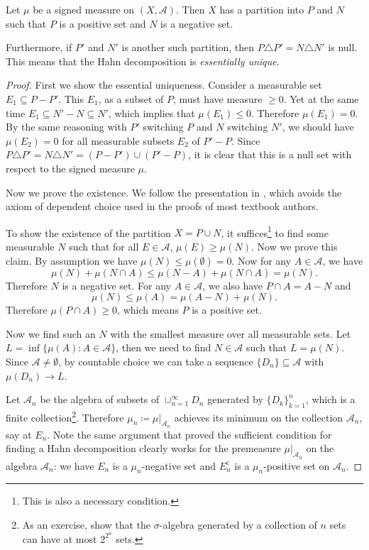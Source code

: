 \documentclass[10pt]{article}
\makeatletter
\numberwithin{equation}{section}
\theoremstyle{plain-star}
\theoremstyle{definition-star}
\theoremstyle{remark-star}
\newcommand\thmsname{Theorem}
\newcommand\nm@thmtype{theorem}
\theoremstyle{plain-star}
\newenvironment{namedthm}[1][Undefined Theorem Name]{
    \ifx{#1}{Undefined Theorem Name}
    \renewcommand\nm@thmtype{theorem}
    \else\renewcommand\thmsname{#1}
    \renewcommand\nm@thmtype{namedtheorem}
    \fi
    \begin{\nm@thmtype}\def\@currentlabelname{#1}}
    {\end{\nm@thmtype}}
\newcommand{\A}{\mathcal{A}}
\newcommand{\cpl}{\mathrm{c}}
\makeatother
\begin{document}
\begin{namedthm}[Hahn decomposition]
    Let $\mu$ be a signed measure on $(X,\A)$. Then $X$ has a partition into $P$ and $N$ such that $P$ is a positive set and $N$ is a negative set.

    Furthermore, if $P'$ and $N'$ is another such partition, then $P \triangle P' = N \triangle N'$ is null. This means that the Hahn decomposition is \emph{essentially unique}.
\end{namedthm}
\begin{proof}
    First we show the essential uniqueness. Consider a measurable set $E_1 \subseteq P - P'$. This $E_1$, as a subset of $P$, must have measure $\geq 0$. Yet at the same time $E_1 \subseteq N' - N\subseteq N'$, which implies that $\mu(E_1)\leq 0$. Therefore $\mu(E_1) = 0$. By the same reasoning with $P'$ switching $P$ and $N$ switching $N'$, we should have $\mu(E_2) = 0$ for all measurable subsets $E_2$ of $P'-P$. Since $P\triangle P' = N \triangle N' = (P - P')\cup(P' - P)$, it is clear that this is a null set with respect to the signed measure $\mu$.

    Now we prove the existence. We follow the presentation in \cite{Falkner_2019}, which avoids the axiom of dependent choice used in the proofs of most textbook authors.

    To show the existence of the partition $X = P \cup N$, it suffices\footnote{This is also a necessary condition.} to find some measurable $N$ such that for all $E \in \A$, $\mu(E)\geq \mu(N)$. Now we prove this claim. By assumption we have $\mu(N)\leq \mu(\emptyset) = 0$. Now for any $A \in \A$, we have \[
        \mu(N) + \mu(N\cap A) \leq \mu(N-A) + \mu(N\cap A) = \mu(N).
    \] Therefore $N$ is a negative set. For any $A \in \A$, we also have $P\cap A = A - N$ and \[
        \mu(N) \leq \mu(A) = \mu(A - N) + \mu(N).
    \] Therefore $\mu(P\cap A)\geq 0$, which means $P$ is a positive set.
    
    Now we find such an $N$ with the smallest measure over all measurable sets. Let $L = \inf\{\mu(A): A\in \A\}$, then we need to find $N \in \A$ such that $L = \mu(N)$. Since $\A \neq \emptyset$, by countable choice we can take a sequence $\{D_n\}\subseteq \A$ with $\mu(D_n)\to L$.

    Let $\A_n$ be the algebra of subsets of $\cup_{n=1}^\infty D_n$ generated by $\{D_k\}_{k=1}^n$, which is a finite collection\footnote{As an exercise, show that the $\sigma$-algebra generated by a collection of $n$ sets can have at most $2^{2^n}$ sets.}. Therefore $\mu_n \coloneqq \mu|_{\A_n}$ achieves its minimum on the collection $\A_n$, say at $E_n$. Note the same argument that proved the sufficient condition for finding a Hahn decomposition clearly works for the premeasure $\mu|_{\A_n}$ on the algebra $\A_n$: we have $E_n$ is a $\mu_n$-negative set and $E_n^\cpl$ is a $\mu_n$-positive set on $\A_n$.


\end{proof}
\end{document}
